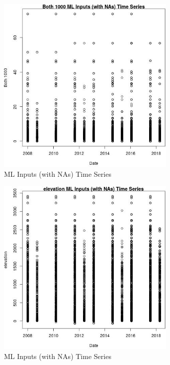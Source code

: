 \begin{figure} 
\centering  
\includegraphics[width=0.77\textwidth]{Code_Outputs/Report_ML_input_PM25_Step4_part_e_de_duplicated_aves_compiled_2019-05-18wNAs_Both_1000vDate.jpg} 
\caption{\label{fig:Report_ML_input_PM25_Step4_part_e_de_duplicated_aves_compiled_2019-05-18wNAsBoth_1000vDate}ML Inputs (with NAs) Time Series} 
\end{figure} 
 

\begin{figure} 
\centering  
\includegraphics[width=0.77\textwidth]{Code_Outputs/Report_ML_input_PM25_Step4_part_e_de_duplicated_aves_compiled_2019-05-18wNAs_elevationvDate.jpg} 
\caption{\label{fig:Report_ML_input_PM25_Step4_part_e_de_duplicated_aves_compiled_2019-05-18wNAselevationvDate}ML Inputs (with NAs) Time Series} 
\end{figure} 
 

